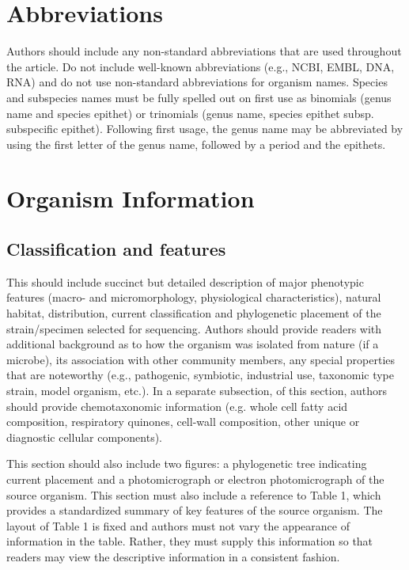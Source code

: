\documentclass{bmcart}
\begin{document}
\section*{Abbreviations}
Authors should include any non-standard abbreviations that are used throughout the article. Do not include well-known abbreviations (e.g., NCBI, EMBL, DNA, RNA) and do not use non-standard abbreviations for organism names. Species and subspecies names must be fully spelled out on first use as binomials (genus name and species epithet) or trinomials (genus name, species epithet subsp. subspecific epithet). Following first usage, the genus name may be abbreviated by using the first letter of the genus name, followed by a period and the epithets.


\section*{Organism Information}


\subsection*{Classification and features}
This should include succinct but detailed description of major phenotypic features (macro- and micromorphology, physiological characteristics), natural habitat, distribution, current classification and phylogenetic placement of the strain/specimen selected for sequencing. Authors should provide readers with additional background as to how the organism was isolated from nature (if a microbe), its association with other community members, any special properties that are noteworthy (e.g., pathogenic, symbiotic, industrial use, taxonomic type strain, model organism, etc.). In a separate subsection, of this section, authors should provide chemotaxonomic information (e.g. whole cell fatty acid composition, respiratory quinones, cell-wall composition, other unique or diagnostic cellular components).

This section should also include two figures: a phylogenetic tree indicating current placement and a photomicrograph or electron photomicrograph of the source organism. This section must also include a reference to Table 1, which provides a standardized summary of key features of the source organism. The layout of Table 1 is fixed and authors must not vary the appearance of information in the table. Rather, they must supply this information so that readers may view the descriptive information in a consistent fashion.
\end{document}
